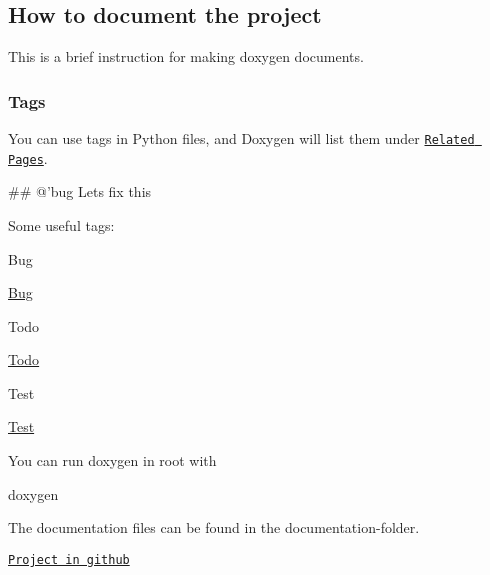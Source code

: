 \subsection*{How to document the project}

This is a brief instruction for making doxygen documents.

\subsubsection*{Tags}

You can use tags in Python files, and Doxygen will list them under \href{pages.html}{\tt Related Pages}. \begin{DoxyVerb}## @'bug Lets fix this  
\end{DoxyVerb}


Some useful tags\+:
\begin{DoxyItemize}
\item \begin{DoxyRefDesc}{Bug}
\item[\hyperlink{bug__bug000001}{Bug}]\end{DoxyRefDesc}
\begin{DoxyRefDesc}{Todo}
\item[\hyperlink{todo__todo000001}{Todo}]\end{DoxyRefDesc}
\begin{DoxyRefDesc}{Test}
\item[\hyperlink{test__test000001}{Test}]\end{DoxyRefDesc}

\end{DoxyItemize}

You can run doxygen in root with \begin{DoxyVerb}doxygen    
\end{DoxyVerb}


The documentation files can be found in the documentation-\/folder.

\href{https://github.com/Konenako/Ohtuprojekti-kesa2020}{\tt Project in github} 